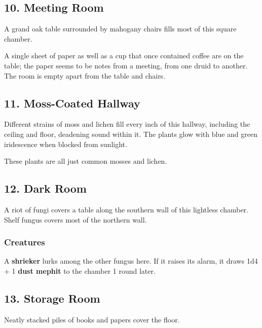 \documentclass[10pt,a4paper,twoside,bg=print,twocolumn,openany,nodeprecatedcode]{dndbook}
\begin{document}
\subsection{10. Meeting Room}
\begin{DndReadAloud}{}
A grand oak table surrounded by mahogany chairs fills most of this square chamber.

\end{DndReadAloud}

A single sheet of paper as well as a cup that once contained coffee are on the table; the paper seems to be notes from a meeting, from one druid to another. The room is empty apart from the table and chairs.

\subsection{11. Moss-Coated Hallway}
\begin{DndReadAloud}{}
Different strains of moss and lichen fill every inch of this hallway, including the ceiling and floor, deadening sound within it. The plants glow with blue and green iridescence when blocked from sunlight.

\end{DndReadAloud}

These plants are all just common mosses and lichen.

\subsection{12. Dark Room}
\begin{DndReadAloud}{}
A riot of fungi covers a table along the southern wall of this lightless chamber. Shelf fungus covers most of the northern wall.

\end{DndReadAloud}

\subsubsection{Creatures}
A \textbf{shrieker} lurks among the other fungus here. If it raises its alarm, it draws 1d4 + 1 \textbf{dust mephit} to the chamber 1 round later.

\subsection{13. Storage Room}
\begin{DndReadAloud}{}
Neatly stacked piles of books and papers cover the floor.

\end{DndReadAloud}
\end{document}
